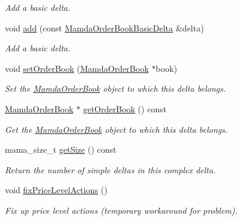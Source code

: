 \begin{CompactItemize}
\begin{CompactList}\small\item\em Add a basic delta. \item\end{CompactList}\item 
void \hyperlink{classWombat_1_1MamdaOrderBookBasicDeltaList_875c4dd8f93d32b261c95116336788ce}{add} (const \hyperlink{classWombat_1_1MamdaOrderBookBasicDelta}{Mamda\-Order\-Book\-Basic\-Delta} \&delta)
\begin{CompactList}\small\item\em Add a basic delta. \item\end{CompactList}\item 
void \hyperlink{classWombat_1_1MamdaOrderBookBasicDeltaList_5ce79be2d4416c566075681ff0fb30f8}{set\-Order\-Book} (\hyperlink{classWombat_1_1MamdaOrderBook}{Mamda\-Order\-Book} $\ast$book)
\begin{CompactList}\small\item\em Set the \hyperlink{classWombat_1_1MamdaOrderBook}{Mamda\-Order\-Book} object to which this delta belongs. \item\end{CompactList}\item 
\hyperlink{classWombat_1_1MamdaOrderBook}{Mamda\-Order\-Book} $\ast$ \hyperlink{classWombat_1_1MamdaOrderBookBasicDeltaList_9172d0229dad18ba085e57cf9ccad404}{get\-Order\-Book} () const 
\begin{CompactList}\small\item\em Get the \hyperlink{classWombat_1_1MamdaOrderBook}{Mamda\-Order\-Book} object to which this delta belongs. \item\end{CompactList}\item 
mama\_\-size\_\-t \hyperlink{classWombat_1_1MamdaOrderBookBasicDeltaList_1fe708dd0e109903a4ab216e390b74ec}{get\-Size} () const 
\begin{CompactList}\small\item\em Return the number of simple deltas in this complex delta. \item\end{CompactList}\item 
void \hyperlink{classWombat_1_1MamdaOrderBookBasicDeltaList_04e7cdfa64d6a7318a6fc5b7a84bb195}{fix\-Price\-Level\-Actions} ()
\begin{CompactList}\small\item\em Fix up price level actions (temporary workaround for problem). \item\end{CompactList}\item 

\end{CompactItemize}
